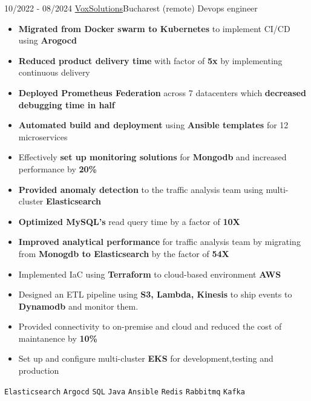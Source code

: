 \documentclass[9pt]{developercv} %
\begin{document}
\begin{entrylist}
    \entry
    {10/2022 - 08/2024}
    {\href{https://voxsolutions.co/}{VoxSolutions}\newline\small\textnormal{Bucharest (remote)}}
    {Devops engineer}
    {\vspace{-6pt}
    \begin{itemize}[itemsep=2pt,topsep=0pt,parsep=0pt,partopsep=0pt, leftmargin=-1pt]
        \item{\textbf{Migrated from Docker swarm to Kubernetes} to implement CI/CD using \textbf{Arogocd}}
        \item{\textbf{Reduced product delivery time} with factor of \textbf{5x} by implementing continuous delivery}
        \item{\textbf{Deployed Prometheus Federation} across 7 datacenters which \textbf{decreased debugging time in half}}
        \item{\textbf{Automated build and deployment} using \textbf{Ansible templates} for 12 microservices}
        \item{Effectively \textbf{set up monitoring solutions} for \textbf{Mongodb} and increased performance by \textbf{20\%}}
        \item{\textbf{Provided anomaly detection} to the traffic analysis team using multi-cluster \textbf{Elasticsearch}}
        \item{\textbf{Optimized MySQL's} read query time by a factor of \textbf{10X}}
        \item{\textbf{Improved analytical performance}  for traffic analysis team by migrating from \textbf{Monogdb to Elasticsearch} by the factor of \textbf{54X}}
        \item{Implemented IaC using \textbf{Terraform} to cloud-based environment \textbf{AWS}}
        \item{Designed an ETL pipeline using \textbf{S3, Lambda, Kinesis} to ship events to \textbf{Dynamodb} and monitor them.}
        \item{Provided connectivity to on-premise and cloud and reduced the cost of maintanence by \textbf{10\%}}
        \item{Set up and configure multi-cluster \textbf{EKS} for development,testing and production}
    \end{itemize}
    {\vspace{2pt}}
    \texttt{Elasticsearch} \slashsep \texttt{Argocd} \slashsep \texttt{SQL} \slashsep \texttt{Java} \slashsep \texttt{Ansible} \slashsep \texttt{Redis} \slashsep \texttt{Rabbitmq} \slashsep \texttt{Kafka}}
\end{entrylist}
\end{document}
